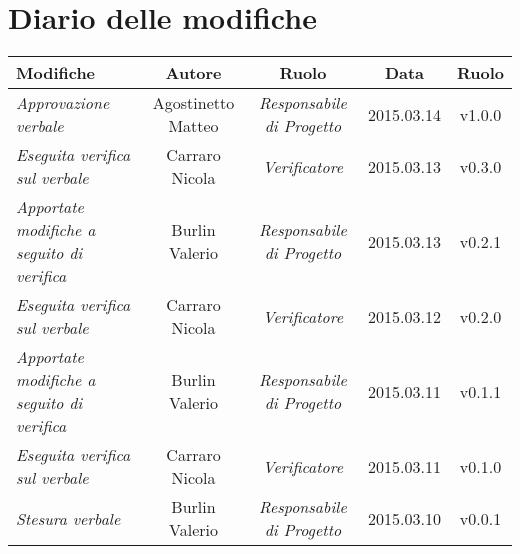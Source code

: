 \newpage
\section*{Diario delle modifiche}

\begin{table}[h]
\centering
\begin{tabular}{|p{}|c|c|c|c|}
	\toprule
		\textbf{Modifiche} & \textbf{Autore} & \textbf{Ruolo} & \textbf{Data} & \textbf{Ruolo} \\
	\midrule
	\midrule
		\textit{Approvazione verbale} & Agostinetto Matteo & \textit{Responsabile di Progetto} & 2015.03.14 & v1.0.0 \\
	\midrule
		\textit{Eseguita verifica sul verbale} & Carraro Nicola & \textit{Verificatore} & 2015.03.13 & v0.3.0 \\							
	\midrule
		\textit{Apportate modifiche a seguito di verifica} & Burlin Valerio & \textit{Responsabile di Progetto} & 2015.03.13 & v0.2.1 \\
	\midrule
		\textit{Eseguita verifica sul verbale} & Carraro Nicola & \textit{Verificatore} & 2015.03.12 & v0.2.0 \\
	\midrule
		\textit{Apportate modifiche a seguito di verifica} & Burlin Valerio & \textit{Responsabile di Progetto} & 2015.03.11 & v0.1.1 \\
	\midrule
		\textit{Eseguita verifica sul verbale} & Carraro Nicola & \textit{Verificatore} & 2015.03.11 & v0.1.0 \\
	\midrule
		\textit{Stesura verbale} & Burlin Valerio & \textit{Responsabile di Progetto} & 2015.03.10 & v0.0.1 \\
	\bottomrule
\end{tabular}	
\end{table}

\newpage